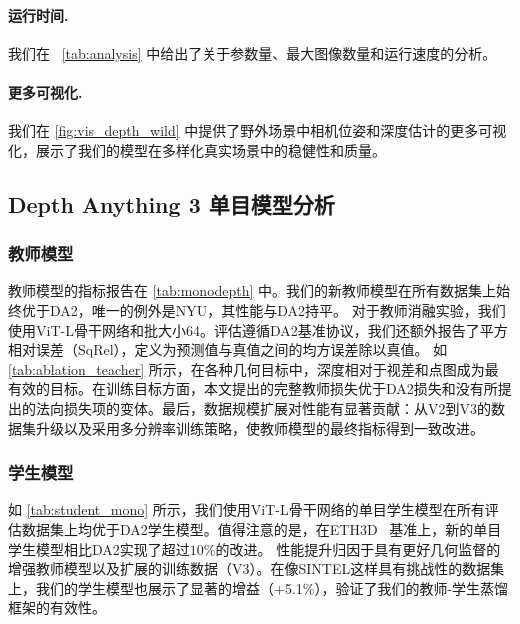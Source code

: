 {\paragraph{运行时间.}
我们在 ~\cref{tab:analysis} 中给出了关于参数量、最大图像数量和运行速度的分析。






\paragraph{更多可视化.}
我们在 \cref{fig:vis_depth_wild} 中提供了野外场景中相机位姿和深度估计的更多可视化，展示了我们的模型在多样化真实场景中的稳健性和质量。

\subsection{Depth Anything 3 单目模型分析}

\subsubsection{教师模型}
教师模型的指标报告在 \cref{tab:monodepth} 中。我们的新教师模型在所有数据集上始终优于DA2，唯一的例外是NYU，其性能与DA2持平。
对于教师消融实验，我们使用ViT-L骨干网络和批大小64。评估遵循DA2基准协议，我们还额外报告了平方相对误差（SqRel），定义为预测值与真值之间的均方误差除以真值。
如 \cref{tab:ablation_teacher} 所示，在各种几何目标中，深度相对于视差和点图成为最有效的目标。在训练目标方面，本文提出的完整教师损失优于DA2损失和没有所提出的法向损失项的变体。最后，数据规模扩展对性能有显著贡献：从V2到V3的数据集升级以及采用多分辨率训练策略，使教师模型的最终指标得到一致改进。

\subsubsection{学生模型}
如 \cref{tab:student_mono} 所示，我们使用ViT-L骨干网络的单目学生模型在所有评估数据集上均优于DA2学生模型。值得注意的是，在ETH3D~\cite{schops2017eth3d} 基准上，新的单目学生模型相比DA2实现了超过$10\%$的改进。
性能提升归因于具有更好几何监督的增强教师模型以及扩展的训练数据（V3）。在像SINTEL这样具有挑战性的数据集上，我们的学生模型也展示了显著的增益（+5.1\%），验证了我们的教师-学生蒸馏框架的有效性。

\begin{table}[b!]
    \centering
    \caption{\textbf{单目学生深度比较.} $\delta_1 \uparrow$}
    \label{tab:student_mono}
\end{table}

}
